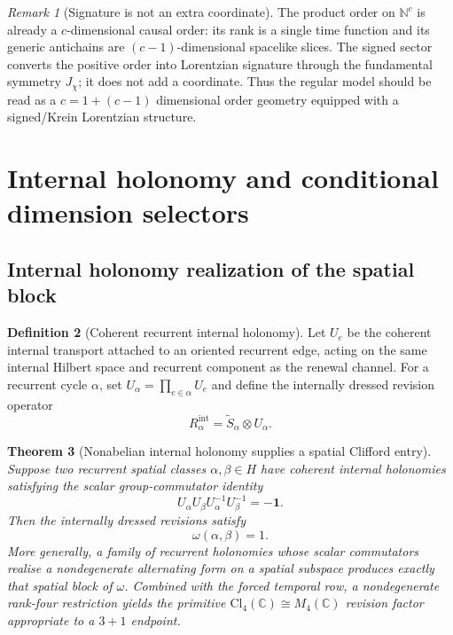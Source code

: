 \documentclass[11pt]{article}
\newtheorem{theorem}{Theorem}[section]
\theoremstyle{definition}
\newtheorem{definition}[theorem]{Definition}
\theoremstyle{remark}
\newtheorem{remark}[theorem]{Remark}
\newcommand{\N}{\mathbb{N}}
\newcommand{\C}{\mathbb{C}}
\newcommand{\Cl}{\mathrm{Cl}}
\newcommand{\one}{\mathbf{1}}
\begin{document}
\begin{remark}[Signature is not an extra coordinate]
\label{rem:dimension-count}
The product order on $\N^c$ is already a $c$-dimensional causal order: its rank is a single time function and its generic antichains are $(c-1)$-dimensional spacelike slices.  The signed sector converts the positive order into Lorentzian signature through the fundamental symmetry $J_\chi$; it does not add a coordinate.  Thus the regular model should be read as a $c=1+(c-1)$ dimensional order geometry equipped with a signed/Krein Lorentzian structure.
\end{remark}




\section{Internal holonomy and conditional dimension selectors}
\label{app:conditional-dimension}

\subsection{Internal holonomy realization of the spatial block}

\begin{definition}[Coherent recurrent internal holonomy]
\label{def:coherent-internal-holonomy}
Let $U_e$ be the coherent internal transport attached to an oriented recurrent
edge, acting on the same internal Hilbert space and recurrent component as the
renewal channel.  For a recurrent cycle $\alpha$, set
$U_\alpha=\prod_{e\in\alpha}U_e$ and define the internally dressed revision
operator
\[
 R_\alpha^{\mathrm{int}}=\widetilde S_\alpha\otimes U_\alpha.
\]
\end{definition}

\begin{theorem}[Nonabelian internal holonomy supplies a spatial Clifford entry]
\label{thm:nonabelian-holonomy-spatial-entry}
Suppose two recurrent spatial classes $\alpha,\beta\in H$ have coherent internal
holonomies satisfying the scalar group-commutator identity
\[
 U_\alpha U_\beta U_\alpha^{-1}U_\beta^{-1}
 =-\one.
\]
Then the internally dressed revisions satisfy
\[
 \omega(\alpha,\beta)=1.
\]
More generally, a family of recurrent holonomies whose scalar commutators realise
a nondegenerate alternating form on a spatial subspace produces exactly that
spatial block of $\omega$.  Combined with the forced temporal row, a
nondegenerate rank-four restriction yields the primitive
$\Cl_4(\C)\cong M_4(\C)$ revision factor appropriate to a $3+1$ endpoint.
\end{theorem}
\end{document}
